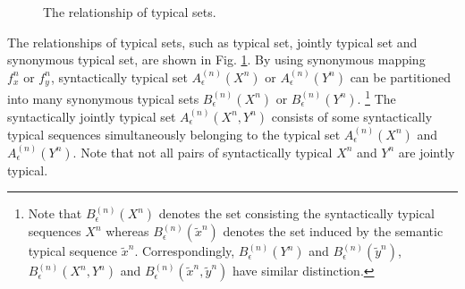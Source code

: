 \documentclass[12pt, draftclsnofoot,onecolumn]{IEEEtran}
\begin{document}
\begin{figure}[htbp]
\setlength{\abovecaptionskip}{0.cm}
\setlength{\belowcaptionskip}{-0.cm}
  \caption{The relationship of typical sets.}\label{Typical_set_relation}
\end{figure}

The relationships of typical sets, such as typical set, jointly typical set and synonymous typical set, are shown in Fig. \ref{Typical_set_relation}. By using synonymous mapping $f_x^n \text{ or } f_y^n$, syntactically typical set $A_{\epsilon}^{(n)}(X^n) \text{ or } A_{\epsilon}^{(n)}(Y^n)$ can be partitioned into many synonymous typical sets $B_{\epsilon}^{(n)}(X^n)\text{ or } B_{\epsilon}^{(n)}(Y^n)$. \footnote{Note that $B_{\epsilon}^{(n)}(X^n)$ denotes the set consisting the syntactically typical sequences $X^n$ whereas $B_{\epsilon}^{(n)}(\tilde{x}^n)$ denotes the set induced by the semantic typical sequence $\tilde{x}^n$. Correspondingly, $B_{\epsilon}^{(n)}(Y^n)$ and $B_{\epsilon}^{(n)}(\tilde{y}^n)$, $B_{\epsilon}^{(n)}(X^n,Y^n)$ and $B_{\epsilon}^{(n)}(\tilde{x}^n,\tilde{y}^n)$ have similar distinction.} The syntactically jointly typical set $A_{\epsilon}^{(n)}(X^n,Y^n)$ consists of some syntactically typical sequences simultaneously belonging to the typical set $A_{\epsilon}^{(n)}(X^n)$ and $A_{\epsilon}^{(n)}(Y^n)$. Note that not all pairs of syntactically typical $X^n$ and $Y^n$ are jointly typical.
\end{document}
